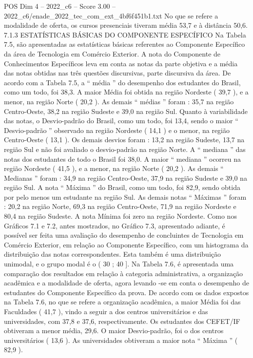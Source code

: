 \begin{textsample}{POS Dim 4 – 2022\_c6 – Score 3.00 – 2022\_c6/enade\_2022\_tec\_com\_ext\_4bf6f451b1.txt}
No que se refere a modalidade de oferta, os cursos presenciais tiveram média 53,7 e à distância 50,6. 7.1.3 ESTATÍSTICAS BÁSICAS DO COMPONENTE ESPECÍFICO Na Tabela 7.5, são apresentadas as estatísticas básicas referentes ao Componente Específico da área de Tecnologia em Comércio Exterior.
A nota do Componente de Conhecimentos Específicos leva em conta as notas da parte objetiva e a média das notas obtidas nas três questões discursivas, parte discursiva da área.
De acordo com a Tabela 7.5, a “ média ” do desempenho dos estudantes do Brasil, como um todo, foi 38,3.
A maior Média foi obtida na região Nordeste ( 39,7 ), e a menor, na região Norte ( 20,2 ).
As demais “ médias ” foram : 35,7 na região Centro-Oeste, 38,2 na região Sudeste e 39,0 na região Sul.
Quanto à variabilidade das notas, o Desvio-padrão do Brasil, como um todo, foi 13,4, sendo o maior “ Desvio-padrão ” observado na região Nordeste ( 14,1 ) e o menor, na região Centro-Oeste ( 13,1 ).
Os demais desvios foram : 13,2 na região Sudeste, 13,7 na região Sul e não foi avaliado o desvio-padrão na região Norte.
A “ mediana ” das notas dos estudantes de todo o Brasil foi 38,0.
A maior “ mediana ” ocorreu na região Nordeste ( 41,5 ), e a menor, na região Norte ( 20,2 ).
As demais “ Medianas ” foram : 34,9 na região Centro-Oeste, 37,9 na região Sudeste e 39,0 na região Sul.
A nota “ Máxima ” do Brasil, como um todo, foi 82,9, sendo obtida por pelo menos um estudante na região Sul.
As demais notas “ Máximas ” foram : 20,2 na região Norte, 69,3 na região Centro-Oeste, 71,9 na região Nordeste e 80,4 na região Sudeste.
A nota Mínima foi zero na região Nordeste.
Como nos Gráficos 7.1 e 7.2, antes mostrados, no Gráfico 7.3, apresentado adiante, é possível ser feita uma avaliação do desempenho de concluintes de Tecnologia em Comércio Exterior, em relação ao Componente Específico, com um histograma da distribuição das notas correspondentes.
Esta também é uma distribuição unimodal, e o grupo modal é o ( 30 ; 40 ].
Na Tabela 7.6, é apresentada uma comparação dos resultados em relação à categoria administrativa, a organização acadêmica e a modalidade de oferta, agora levando -se em conta o desempenho de estudantes do Componente Específico da prova.
De acordo com os dados expostos na Tabela 7.6, no que se refere a organização acadêmica, a maior Média foi das Faculdades ( 41,7 ), vindo a seguir a dos centros universitários e das universidades, com 37,8 e 37,6, respectivamente.
Os estudantes dos CEFET/IF obtiveram a menor média, 29,6.
O maior Desvio-padrão, foi o dos centros universitários ( 13,6 ).
As universidades obtiveram a maior nota “ Máxima ” ( 82,9 ).

\end{textsample}
